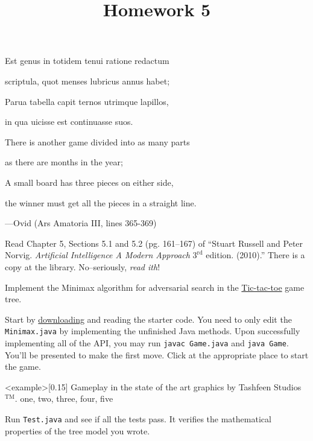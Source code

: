 \documentclass{homework}
\title{Homework 5}
\begin{document}
 \maketitle

\begin{minipage}[t]{0.45\textwidth}
  \begin{em}
    Est genus in totidem tenui ratione redactum

    scriptula, quot menses lubricus annus habet;

    Parua tabella capit ternos utrimque lapillos,

    in qua uicisse est continuasse suos.
  \end{em}
\end{minipage}
\begin{minipage}[t]{0.5\textwidth}
  There is another game divided into as many parts

  as there are months in the year;

  A small board has three pieces on either side,

  the winner must get all the pieces in a straight line.
\end{minipage}
\begin{flushright}
  ---Ovid (Ars Amatoria III, lines 365-369)
\end{flushright}

\question Read Chapter 5, Sections 5.1 and 5.2 (pg. 161--167) of
``Stuart Russell and Peter Norvig. \emph{Artificial Intelligence A
  Modern Approach} $3^\text{rd}$ edition. (2010).'' There is a copy at
the library. No--seriously, \emph{read ith}!

\question Implement the Minimax algorithm for adversarial search in the
\href{https://en.wikipedia.org/wiki/Tic-tac-toe}{Tic-tac-toe} game tree.

Start by \href{https://tashfeen.org/s/ds/minimax.zip}{downloading}
and reading the starter code. You need to only edit the
\texttt{Minimax.java} by implementing the unfinished Java
methods. Upon successfully implementing all of the API, you may run
\texttt{javac Game.java} and \texttt{java Game}. You'll be presented
to make the first move.  Click at the appropriate place to start the
game.

\img<example>[0.15]{%
  Gameplay in the state of the art graphics by Tashfeen Studios$^\text{TM}$.
}{one, two, three, four, five}

Run \texttt{Test.java} and see if all the tests pass. It verifies the
mathematical properties of the tree model you wrote.
\end{document}
